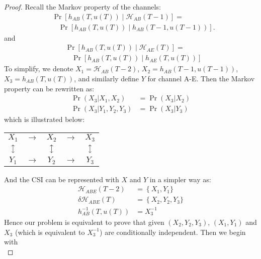 \begin{proof}
Recall the Markov property of the channels:
\begin{equation*}
\begin{split}
& \Pr\left[h_{AB}\left(T, u(T)\right)\mid \mathcal{H}_{AB}(T-1)\right] = \\
& \ \ \ \ \Pr\left[h_{AB}\left(T, u(T) \right) \mid h_{AB}\left(T-1, u(T-1)\right)\right].
\end{split}
\end{equation*}
and
\begin{equation*}
\begin{split}
& \Pr\left[h_{AB}\left(T,u(T)\right)\mid \mathcal{H}_{AE}(T)\right] = \\
& \ \ \ \ \Pr\left[h_{AB}\left(T, u(T) \right) \mid h_{AE}\left(T, u(T)\right)\right]
\end{split}
\end{equation*}
To simplify, we denote $X_1 = \mathcal{H}_{AB}(T-2)$, $X_2 = h_{AB}(T-1,u(T-1))$, $X_3 = h_{AB}(T,u(T))$, and similarly define $Y$ for channel A-E. Then the Markov property can be rewritten as:
\begin{align*}
    \Pr(X_3|X_1,X_2) & = \Pr(X_3|X_2)\\
    \Pr(X_3|Y_1,Y_2,Y_3) & = \Pr(X_3|Y_3)
\end{align*}
which is illustrated below:
\begin{center}
\begin{tabular}{ c c c c c}
 $X_1$ & $\longrightarrow$ & $X_2$ & $\longrightarrow$ & $X_3$ \\ 
 $\big\updownarrow$ &  & $\big\updownarrow$ &  & $\big\updownarrow$ \\
 $Y_1$ & $\longrightarrow$ & $Y_2$ & $\longrightarrow$ & $Y_3$
\end{tabular}
\end{center}
And the CSI can be represented with $X$ and $Y$ in a simpler way as:
\begin{align*}
\mathcal{H}_{ABE}(T-2) & = \left\{ \right.  \left. X_1, \right. \left. Y_1 \right. \}\\
\delta \mathcal{H}_{ABE}(T) & = \left\{ \right.  \left. X_2, \right. \left. Y_2, \right. \left. Y_3 \right. \}\\
h_{AB}^{-1}\left( T,u(T)\right) & =   \left.X_3^{-1} \right.
\end{align*}
Hence our problem is equivalent to prove that given $(X_2,Y_2,Y_3)$, $(X_1,Y_1)$ and $X_3$ (which is equivalent to $X_3^{-1}$) are conditionally independent. Then we begin with
\begin{subequations}

\end{subequations}
\end{proof}
